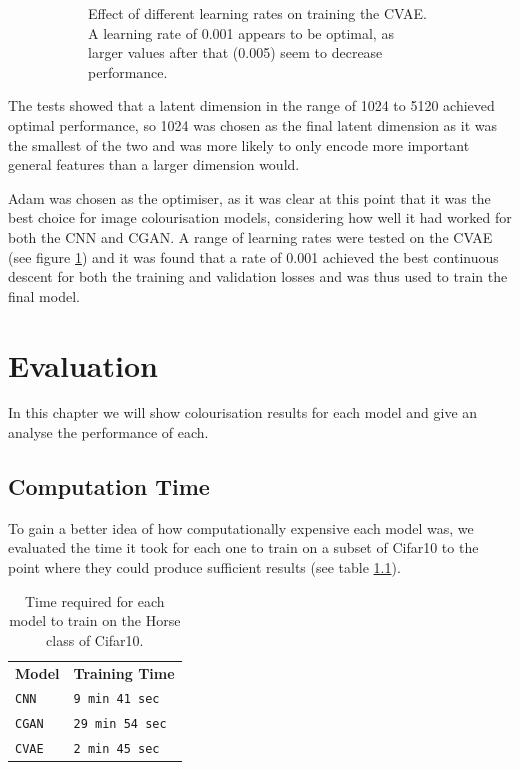 \documentclass{l4proj}
\begin{document}
\begin{figure}[H]
\begin{subfigure}[t]{0.48\textwidth}
        \caption{Effect of different learning rates on training the CVAE. A learning rate of 0.001 appears to be optimal, as larger values after that (0.005) seem to decrease performance.}
        \label{fig:vae_learning_rates}
    \end{subfigure} 
    \caption{}
    \label{fig:vae_hyperparameters}
\end{figure}

The tests showed that a latent dimension in the range of 1024 to 5120 achieved optimal performance, so 1024 was chosen as the final latent dimension as it was the smallest of the two and was more likely to only encode more important general features than a larger dimension would.

Adam was chosen as the optimiser, as it was clear at this point that it was the best choice for image colourisation models, considering how well it had worked for both the CNN and CGAN. A range of learning rates were tested on the CVAE (see figure \ref{fig:vae_learning_rates}) and it was found that a rate of 0.001 achieved the best continuous descent for both the training and validation losses and was thus used to train the final model.

\chapter{Evaluation} 
In this chapter we will show colourisation results for each model and give an analyse the performance of each.

\section{Computation Time}
\label{computationtime}
To gain a better idea of how computationally expensive each model was, we evaluated the time it took for each one to train on a subset of Cifar10 to the point where they could produce sufficient results (see table \ref{tab:times}).

\begin{table}[H]
    \centering
    \begin{tabular}{ll}
        \textbf{Model} & \textbf{Training Time} \\   
        \texttt{CNN} & \texttt{9 min 41 sec} \\
        \texttt{CGAN} & \texttt{29 min 54 sec} \\
        \texttt{CVAE} & \texttt{2 min 45 sec} \\
    \end{tabular}
    \caption{Time required for each model to train on the Horse class of Cifar10.}
    \label{tab:times}
\end{table}
\end{document}
